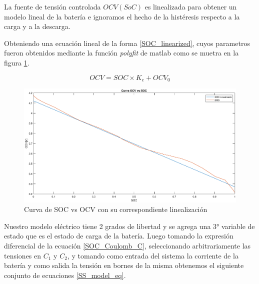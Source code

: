 \documentclass[10pt,a4paper]{article}
\begin{document}
\noindent La fuente de tensión controlada $OCV(SoC)$ es linealizada para 
obtener un modelo lineal de la batería e ignoramos el hecho de la histéresis 
respecto a la carga y a la descarga.

Obteniendo una ecuación lineal de la forma \ref{SOC_linearized}, cuyos
parametros fueron obtenidos mediante la función \emph{polyfit} de matlab como se
muetra en la figura \ref{SOC_vs_OCV}.

\begin{equation}
    OCV = SOC \times K_e + OCV_0
    \label{SOC_linearized}
\end{equation}

\begin{figure}[h!]
    \begin{center}
	\includegraphics[width=1\textwidth]{SOC_vs_OCV.eps}
	\caption{Curva de SOC vs OCV con su correspondiente linealización }
	\label{SOC_vs_OCV}
    \end{center}
\end{figure}
\FloatBarrier

Nuestro modelo eléctrico tiene 2 grados de libertad y se agrega una 3° variable
de estado que es el estado de carga de la batería. Luego tomando la expresión
diferencial de la ecuación \ref{SOC_Coulomb_C}, seleccionando arbitrariamente
las tensiones en $C_1$ y $C_2$, y tomando como entrada del sistema la corriente
de la batería y como salida la tensión en bornes de la misma obtenemos el
siguiente conjunto de ecuaciones \ref{SS_model_eq}.
\end{document}
